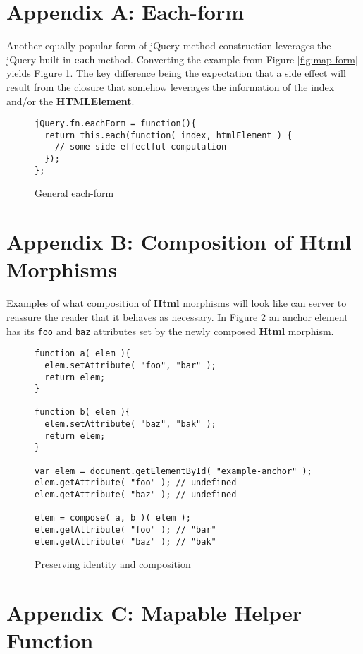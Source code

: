 \documentclass[preprint, leqno]{sigplanconf}
\begin{document}
\appendix
\section{Appendix A: Each-form}

Another equally popular form of jQuery method construction leverages the jQuery built-in \verb|each| method. Converting the example from Figure \ref{fig:map-form} yields Figure \ref{fig:each-form}. The key difference being the expectation that a side effect will result from the closure that somehow leverages the information of the index and/or the \textbf{HTMLElement}.

\begin{figure}[!ht]
\small
\begin{verbatim}
jQuery.fn.eachForm = function(){
  return this.each(function( index, htmlElement ) {
    // some side effectful computation
  });
};
\end{verbatim}
\nocaptionrule \caption{General each-form}
\label{fig:each-form}
\end{figure}

\section{Appendix B: Composition of Html Morphisms}

Examples of what composition of \textbf{Html} morphisms will look like can server to reassure the reader that it behaves as necessary. In Figure \ref{fig:html-compose} an anchor element has its \verb|foo| and \verb|baz| attributes set by the newly composed \textbf{Html} morphism.

\begin{figure}[!ht]
\small
\begin{verbatim}
function a( elem ){
  elem.setAttribute( "foo", "bar" );
  return elem;
}

function b( elem ){
  elem.setAttribute( "baz", "bak" );
  return elem;
}

var elem = document.getElementById( "example-anchor" );
elem.getAttribute( "foo" ); // undefined
elem.getAttribute( "baz" ); // undefined

elem = compose( a, b )( elem );
elem.getAttribute( "foo" ); // "bar"
elem.getAttribute( "baz" ); // "bak"
\end{verbatim}
\nocaptionrule \caption{Preserving identity and composition}
\label{fig:html-compose}
\end{figure}

\section{Appendix C: Mapable Helper Function}
\end{document}
